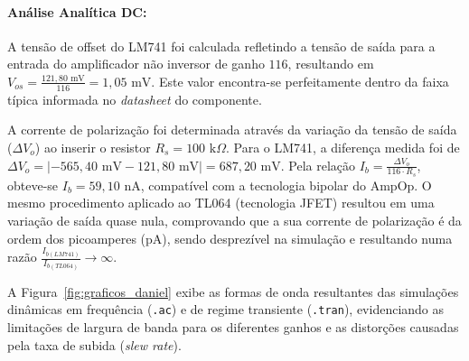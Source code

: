 \documentclass[11pt,a4paper]{article}
\begin{document}
\paragraph{Análise Analítica DC:}
A tensão de offset do LM741 foi calculada refletindo a tensão de saída para a entrada do amplificador não inversor de ganho $116$, resultando em $V_{os}=\frac{121{,}80\text{ mV}}{116}=1{,}05\text{ mV}$. Este valor encontra-se perfeitamente dentro da faixa típica informada no \textit{datasheet} do componente. 

A corrente de polarização foi determinada através da variação da tensão de saída ($\Delta V_o$) ao inserir o resistor $R_s=100\text{ k}\Omega$. Para o LM741, a diferença medida foi de $\Delta V_o=|-565{,}40\text{ mV}-121{,}80\text{ mV}|=687{,}20\text{ mV}.$ Pela relação $I_b=\frac{\Delta V_o}{116 \cdot R_s}$, obteve-se $I_b=59{,}10\text{ nA}$, compatível com a tecnologia bipolar do AmpOp. O mesmo procedimento aplicado ao TL064 (tecnologia JFET) resultou em uma variação de saída quase nula, comprovando que a sua corrente de polarização é da ordem dos picoamperes (pA), sendo desprezível na simulação e resultando numa razão $\frac{I_{b(LM741)}}{I_{b(TL064)}} \to \infty$.

A Figura~\ref{fig:graficos_daniel} exibe as formas de onda resultantes das simulações dinâmicas em frequência (\texttt{.ac}) e de regime transiente (\texttt{.tran}), evidenciando as limitações de largura de banda para os diferentes ganhos e as distorções causadas pela taxa de subida (\textit{slew rate}).
\end{document}
